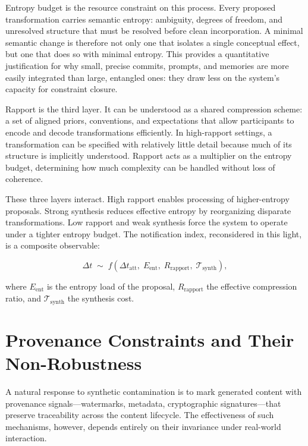 \documentclass[12pt, letterpaper]{article}
\theoremstyle{flyxion}
\begin{document}
Entropy budget is the resource constraint on this process. Every proposed transformation carries semantic entropy: ambiguity, degrees of freedom, and unresolved structure that must be resolved before clean incorporation. A minimal semantic change is therefore not only one that isolates a single conceptual effect, but one that does so with minimal entropy. This provides a quantitative justification for why small, precise commits, prompts, and memories are more easily integrated than large, entangled ones: they draw less on the system's capacity for constraint closure.

Rapport is the third layer. It can be understood as a shared compression scheme: a set of aligned priors, conventions, and expectations that allow participants to encode and decode transformations efficiently. In high-rapport settings, a transformation can be specified with relatively little detail because much of its structure is implicitly understood. Rapport acts as a multiplier on the entropy budget, determining how much complexity can be handled without loss of coherence.

These three layers interact. High rapport enables processing of higher-entropy proposals. Strong synthesis reduces effective entropy by reorganizing disparate transformations. Low rapport and weak synthesis force the system to operate under a tighter entropy budget. The notification index, reconsidered in this light, is a composite observable:

\begin{equation}
\Delta t \;\sim\; f\!\left(\Delta t_\mathrm{att},\; E_{\mathrm{ent}},\; R_\mathrm{rapport},\; \mathcal{T}_\mathrm{synth}\right),
\end{equation}

where $E_\mathrm{ent}$ is the entropy load of the proposal, $R_\mathrm{rapport}$ the effective compression ratio, and $\mathcal{T}_\mathrm{synth}$ the synthesis cost.

\section{Provenance Constraints and Their Non-Robustness}

A natural response to synthetic contamination is to mark generated content with provenance signals---watermarks, metadata, cryptographic signatures---that preserve traceability across the content lifecycle. The effectiveness of such mechanisms, however, depends entirely on their invariance under real-world interaction.
\end{document}
